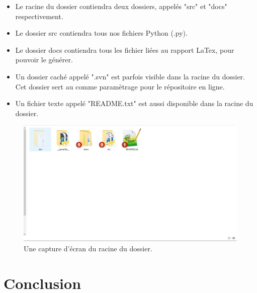 \documentclass[a4paper, 11pt]{article}
\begin{document}
\begin{itemize}

\item{Le racine du dossier contiendra deux dossiers, appelés "src" et "docs" respectivement.}
\item{Le dossier src contiendra tous nos fichiers Python (.py).}
\item{Le dossier docs contiendra tous les fichier liées au rapport LaTex, pour pouvoir le générer.}
\item{Un dossier caché appelé ".svn" est parfois visible dans la racine du dossier. Cet dossier sert au comme paramètrage pour le répositoire en ligne.}
\item{Un fichier texte appelé "README.txt" est aussi disponible dans la racine du dossier.}

\end{itemize}

\begin{figure}

\includegraphics[scale=0.5]{FolderRoot}

\caption{Une capture d'écran du racine du dossier.}

\end{figure}

\newpage

\section{Conclusion}
\end{document}
